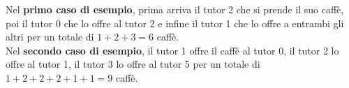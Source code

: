 

\Examples
\begin{example}
%
%
\end{example}


\Explanation
Nel \textbf{primo caso di esempio}, prima arriva il tutor 2 che si prende il suo caff\`e, poi il tutor 0 che lo offre al tutor 2 e infine il tutor 1 che lo offre a entrambi gli altri per un totale di $1+2+3=6$ caff\`e.\\[2mm]
Nel \textbf{secondo caso di esempio}, il tutor 1 offre il caff\`e al tutor 0, il tutor 2 lo offre al tutor 1, il tutor 3 lo offre al tutor 5 per un totale di $1 + 2 + 2 + 2 + 1 + 1 = 9$ caff\`e.
